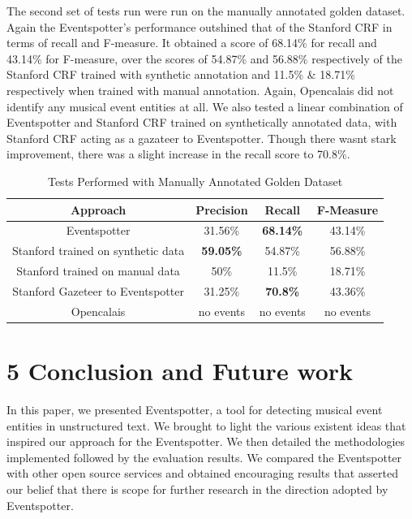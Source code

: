 \documentclass[a4paper,11pt]{report}
\begin{document}
The second set of tests run were run on the manually annotated golden dataset. Again the Eventspotter's performance outshined that of the Stanford CRF in terms of recall and F-measure. It obtained a score of 68.14\% for recall and 43.14\% for F-measure, over the scores of 54.87\% and 56.88\% respectively of the Stanford CRF trained with synthetic annotation and 11.5\% & 18.71\% respectively when trained with manual annotation. Again, Opencalais did not identify any musical event entities at all. We also tested a linear combination of Eventspotter and Stanford CRF trained on synthetically annotated data, with Stanford CRF acting as a gazateer to Eventspotter. Though there wasnt stark improvement, there was a slight increase in the recall score to 70.8\%. 
\begin{table}[ht]
\caption{Tests Performed with Manually Annotated Golden Dataset} %
\centering %
\begin{tabular}{c c c c} %
\hline\hline %
Approach & Precision & Recall & F-Measure \\ [0.5ex] %
\hline %
Eventspotter & 31.56\% & \bf 68.14\% \bf & 43.14\% \\
Stanford trained on synthetic data  & \bf 59.05\%  \bf & 54.87\% & 56.88\%\\
Stanford trained on manual data & 50\% & 11.5\% & 18.71\%  \\
Stanford Gazeteer to Eventspotter & 31.25\% & \bf 70.8\% \bf & 43.36\% \\
Opencalais & no events & no events & no events \\
\hline %
\end{tabular}
\label{table:nonlin} %
\end{table}

\chapter*{5 Conclusion and Future work}

In this paper, we presented Eventspotter, a tool for detecting musical event entities in unstructured text. We brought to light the various existent ideas that inspired our approach for the Eventspotter. We then detailed the methodologies implemented followed by the evaluation results. We compared the Eventspotter with other open source services and obtained encouraging results that asserted our belief that there is scope for further research in the direction adopted by Eventspotter.  
\end{document}
